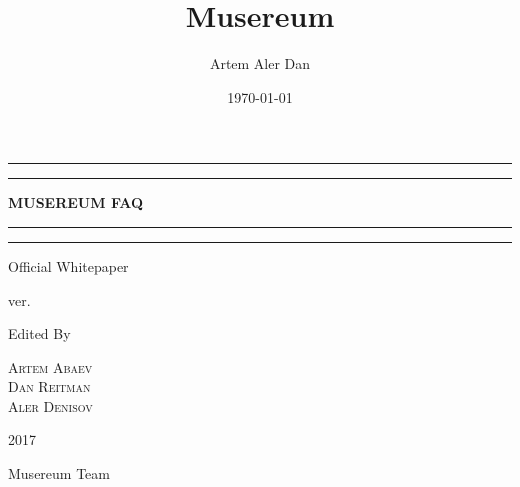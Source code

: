 \documentclass[12pt]{report}
\title{Musereum}
\author{Artem Aler Dan}
\date{\today}
\begin{document}
\begin{titlepage}
	\centering
	
	\scshape %
	\vspace*{\baselineskip} %
	
	\rule{\textwidth}{1.6pt}\vspace*{-\baselineskip}\vspace*{2pt} %
	\rule{\textwidth}{0.4pt} %
	
	\vspace{0.75\baselineskip} %
	
	{\Huge\textbf{MUSEREUM FAQ}} %
	
	\rule{\textwidth}{0.4pt}\vspace*{-\baselineskip}\vspace{3.2pt} %
	\rule{\textwidth}{1.6pt} %
	
	\vspace{1.5\baselineskip} %
	
	
	Official Whitepaper %
	
	\small{ver.\VERSION}
	
	\vspace*{3.5\baselineskip} %
	
	
	
	Edited By
	
	\vspace{0.5\baselineskip} %
	
	{\scshape\Large Artem Abaev \\ Dan Reitman \\ Aler Denisov \\ } %
	
	
	
	\vfill %
	
		
	\vspace{0.3\baselineskip} %
	
	2017 %
	
	{\large Musereum Team} %

\end{titlepage}
\end{document}
